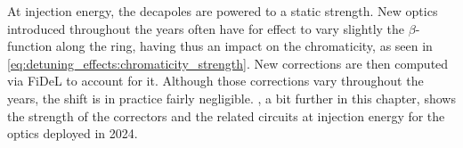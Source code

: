 At injection energy, the decapoles are powered to a static strength. New optics introduced
throughout the years often have for effect to vary slightly the $\beta$-function along the ring,
having thus an impact on the chromaticity, as seen in
\cref{eq:detuning_effects:chromaticity_strength}. New corrections are then computed via FiDeL to
account for it.
Although those corrections vary throughout the years, the shift is in practice fairly negligible.
, a bit further in this chapter, shows the strength of
the correctors and the related circuits at injection energy for the optics deployed in 2024.